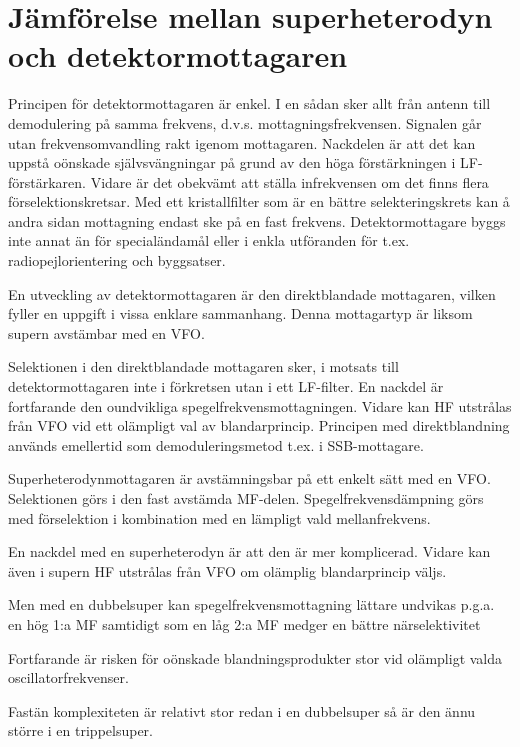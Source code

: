 \section[Jämförelse superheterodyn]{Jämförelse mellan superheterodyn och detektormottagaren}
\label{superheterojämförelse}

Principen för detektormottagaren är enkel. I en sådan sker allt från
antenn till demodulering på samma frekvens,
d.v.s. mottagningsfrekvensen. Signalen går utan frekvensomvandling
rakt igenom mottagaren. Nackdelen är att det kan uppstå oönskade
självsvängningar på grund av den höga förstärkningen i
LF-förstärkaren. Vidare är det obekvämt att ställa infrekvensen om det
finns flera förselektionskretsar. Med ett kristallfilter som är en
bättre selekteringskrets kan å andra sidan mottagning endast ske på en
fast frekvens. Detektormottagare byggs inte annat än för
specialändamål eller i enkla utföranden för
t.ex. radiopejlorientering och byggsatser.

En utveckling av detektormottagaren är den direktblandade mottagaren,
vilken fyller en uppgift i vissa enklare sammanhang.
Denna mottagartyp är liksom supern avstämbar med en VFO.

Selektionen i den direktblandade mottagaren sker, i motsats till
detektormottagaren inte i förkretsen utan i ett LF-filter. En nackdel
är fortfarande den oundvikliga spegelfrekvensmottagningen. Vidare kan
HF utstrålas från VFO vid ett olämpligt val av
blandarprincip. Principen med direktblandning används emellertid som
demoduleringsmetod t.ex. i SSB-mottagare.

Superheterodynmottagaren är avstämningsbar på ett enkelt sätt med en
VFO. Selektionen görs i den fast avstämda
MF-delen. Spegelfrekvensdämpning görs med förselektion i kombination
med en lämpligt vald mellanfrekvens.

En nackdel med en superheterodyn är att den är mer komplicerad. Vidare
kan även i supern HF utstrålas från VFO om olämplig blandarprincip
väljs.

Men med en dubbelsuper kan spegelfrekvensmottagning lättare undvikas
p.g.a.  en hög 1:a MF samtidigt som en låg 2:a MF medger en bättre
närselektivitet

Fortfarande är risken för oönskade blandningsprodukter stor vid
olämpligt valda oscillatorfrekvenser.

Fastän komplexiteten är relativt stor redan i en dubbelsuper så är den
ännu större i en trippelsuper.
